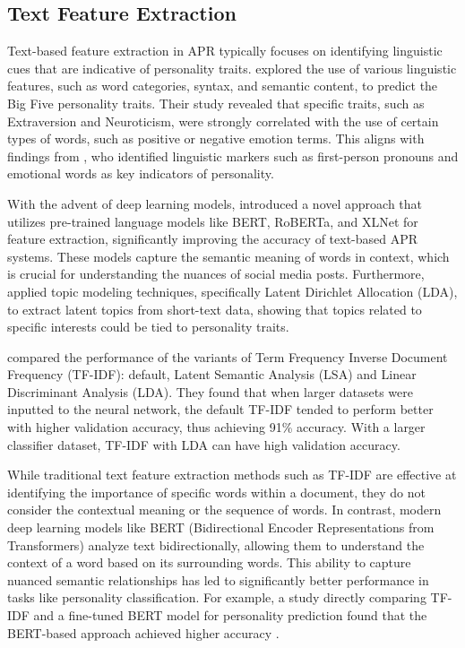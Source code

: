 \subsection{Text Feature Extraction}

Text-based feature extraction in APR typically focuses on identifying linguistic cues that are indicative of personality traits. \citet{mairesse_using_2007} explored the use of various linguistic features, such as word categories, syntax, and semantic content, to predict the Big Five personality traits. Their study revealed that specific traits, such as Extraversion and Neuroticism, were strongly correlated with the use of certain types of words, such as positive or negative emotion terms. This aligns with findings from \citet{Pennebaker1999}, who identified linguistic markers such as first-person pronouns and emotional words as key indicators of personality.

With the advent of deep learning models, \citet{Christian2021} introduced a novel approach that utilizes pre-trained language models like BERT, RoBERTa, and XLNet for feature extraction, significantly improving the accuracy of text-based APR systems. These models capture the semantic meaning of words in context, which is crucial for understanding the nuances of social media posts. Furthermore, \citet{albalawi_using_2020} applied topic modeling techniques, specifically Latent Dirichlet Allocation (LDA), to extract latent topics from short-text data, showing that topics related to specific interests could be tied to personality traits.

\citet{Dzisevic_Sesok_2019} compared the performance of the variants of Term Frequency Inverse Document  Frequency (TF-IDF): default, Latent Semantic Analysis (LSA) and Linear Discriminant Analysis (LDA). They found that when larger datasets were inputted to the neural network, the default TF-IDF tended to perform better with higher validation accuracy, thus achieving 91\% accuracy. With a larger classifier dataset, TF-IDF with LDA can have high validation accuracy.

While traditional text feature extraction methods such as TF-IDF are effective at identifying the importance of specific words within a document, they do not consider the contextual meaning or the sequence of words. In contrast, modern deep learning models like BERT (Bidirectional Encoder Representations from Transformers) analyze text bidirectionally, allowing them to understand the context of a word based on its surrounding words. This ability to capture nuanced semantic relationships has led to significantly better performance in tasks like personality classification. For example, a study directly comparing TF-IDF and a fine-tuned BERT model for personality prediction found that the BERT-based approach achieved higher accuracy \citep{Zhang_2023}. 


